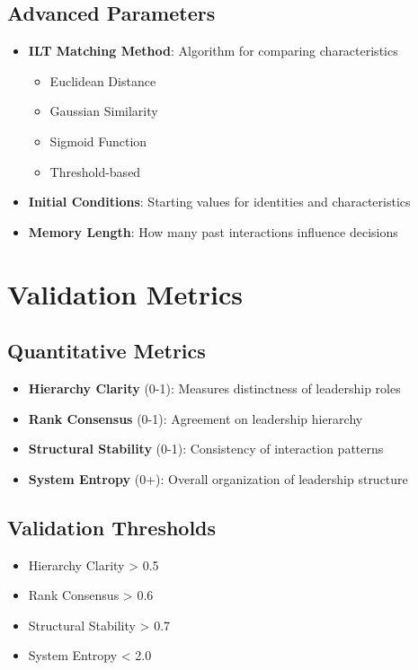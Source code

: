 \documentclass[12pt]{article}
\begin{document}
\subsection{Advanced Parameters}
\begin{itemize}
    \item \textbf{ILT Matching Method}: Algorithm for comparing characteristics
    \begin{itemize}
        \item Euclidean Distance
        \item Gaussian Similarity
        \item Sigmoid Function
        \item Threshold-based
    \end{itemize}
    \item \textbf{Initial Conditions}: Starting values for identities and characteristics
    \item \textbf{Memory Length}: How many past interactions influence decisions
\end{itemize}

\section{Validation Metrics}

\subsection{Quantitative Metrics}
\begin{itemize}
    \item \textbf{Hierarchy Clarity} (0-1): Measures distinctness of leadership roles
    \item \textbf{Rank Consensus} (0-1): Agreement on leadership hierarchy
    \item \textbf{Structural Stability} (0-1): Consistency of interaction patterns
    \item \textbf{System Entropy} (0+): Overall organization of leadership structure
\end{itemize}

\subsection{Validation Thresholds}
\begin{itemize}
    \item Hierarchy Clarity > 0.5
    \item Rank Consensus > 0.6
    \item Structural Stability > 0.7
    \item System Entropy < 2.0
\end{itemize}
\end{document}
